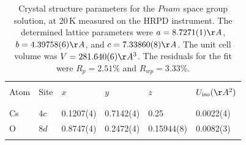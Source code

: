 \documentclass[prb,aps,twocolumn,superscriptaddress,showpacs,footinbib]{revtex4-2}
\begin{document}
\begin{table}
\caption{Crystal structure parameters for the $Pnam$ space group solution, at 20\,K measured on the HRPD instrument. The determined lattice parameters were $a = 8.7271(1) \AA$, $b = 4.39758(6) \AA$, and $c = 7.33860(8)\AA$. The unit cell volume was $V = 281.640(6) \AA^{3}$. The residuals for the fit were $R_{p}=2.51\%$ and $R_{wp}=3.33\%$.}
\centering
\begin{tabular}{ p{10mm}p{8mm}p{15mm}p{15mm}p{15mm}p{15mm}  }
 \hline \hline
 \vspace{1mm} & \vspace{1mm} & \vspace{1mm} & \vspace{1mm} & \vspace{1mm} & \vspace{1mm} \\
 Atom & Site & $x$ & $y$ & $z$ & $U_{\rm{iso}} (\AA^{2})$\\
 \vspace{1mm} & \vspace{1mm} & \vspace{1mm} & \vspace{1mm} & \vspace{1mm} & \vspace{1mm} \\
 \hline
 \vspace{1mm} & \vspace{1mm} & \vspace{1mm} & \vspace{1mm} & \vspace{1mm} & \vspace{1mm} \\
 Cs & $4c$ & 0.1207(4) & 0.7142(4) & 0.25 & 0.0022(4)\\
 O & $8d$ & 0.8747(4) & 0.2472(4) & 0.15944(8) & 0.0082(3)\\
 \vspace{1mm} & \vspace{1mm} & \vspace{1mm} & \vspace{1mm} & \vspace{1mm} & \vspace{1mm} \\
 \hline
\end{tabular}
\label{tab:Pnam_struc}
\end{table}
\end{document}
